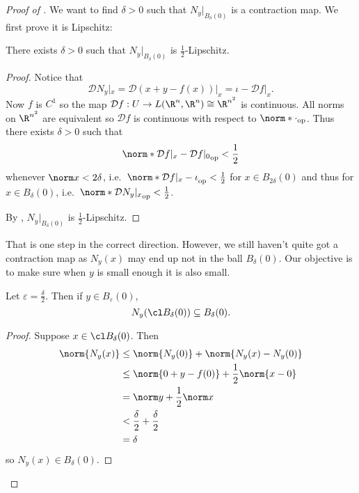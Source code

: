 \documentclass[a4paper]{article}
\newcommand*{\D}{\mathcal{D}}
\newcommand*{\nop}[1]{\norm*{#1}_{\text{op}}}
\theoremstyle{definition}
\begin{document}
\begin{proof}[Proof of ]
  We want to find \(\delta > 0\) such that \(N_y|_{B_\delta(0)}\) is a contraction map. We first prove it is Lipschitz:

  \begin{lemma}
    There exists \(\delta > 0\) such that \(N_y|_{B_\delta(0)}\) is \(\frac{1}{2}\)-Lipschitz.
  \end{lemma}

  \begin{proof}
    Notice that
    \[
      \D N_y|_x = \D (x + y - f(x))|_x = \iota - \D f|_x.
    \]
    Now \(f\) is \(C^1\) so the map \(\D f: U \to L(\R^n, \R^n) \cong \R^{n^2}\) is continuous. All norms on \(\R^{n^2}\) are equivalent so \(\D f\) is continuous with respect to \(\nop \cdot\). Thus there exists \(\delta > 0\) such that
    \[
      \nop{\D f|_x - \D f|_0} < \frac{1}{2}
    \]
    whenever \(\norm x < 2 \delta\), i.e.\ \(\nop{\D f|_x - \iota} < \frac{1}{2}\) for \(x \in B_{2\delta}(0)\) and thus for \(x \in B_{\delta}(0)\), i.e.\ \(\nop{\D N_y|_x} < \frac{1}{2}\).

    By , \(N_y|_{B_\delta(0)}\) is \(\frac{1}{2}\)-Lipschitz.
  \end{proof}

  That is one step in the correct direction. However, we still haven't quite got a contraction map as \(N_y(x)\) may end up not in the ball \(B_\delta(0)\). Our objective is to make sure when \(y\) is small enough it is also small.

  \begin{lemma}
    Let \(\varepsilon = \frac{\delta}{2}\). Then if \(y \in B_\varepsilon(0)\),
    \[
      N_y(\cl B_\delta(0)) \subseteq B_\delta(0).
    \]
  \end{lemma}

  \begin{proof}
    Suppose \(x \in \cl B_\delta(0)\). Then
    \begin{align*}
      \norm{N_y(x)} &\leq \norm{N_y(0)} + \norm{N_y(x) - N_y(0)} \\
                    &\leq \norm{0 + y -f(0)} + \frac{1}{2} \norm{x - 0} \\
                    &= \norm y + \frac{1}{2} \norm x \\
                    &< \frac{\delta}{2} + \frac{\delta}{2} \\
                    &= \delta
    \end{align*}
    so \(N_y(x) \in B_\delta(0)\).
  \end{proof}


\end{proof}
\end{document}
